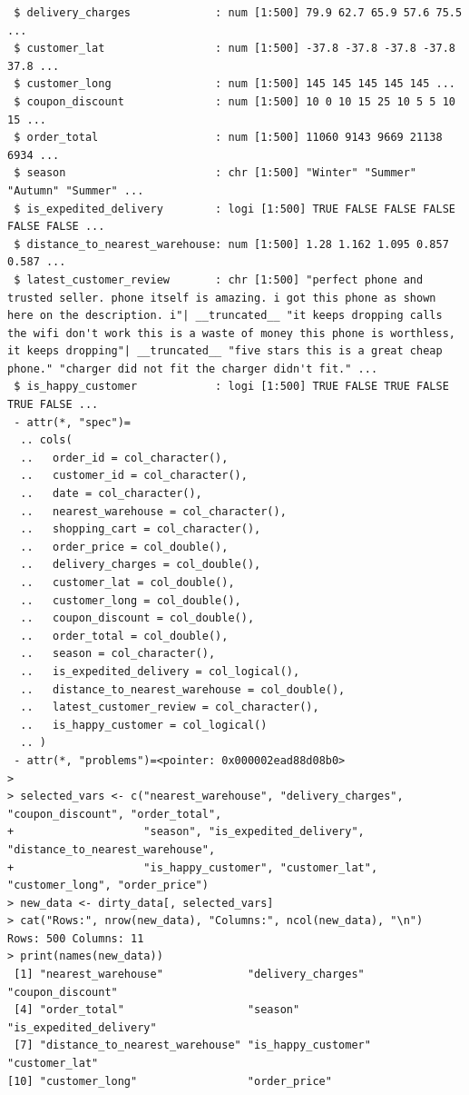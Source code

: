 \documentclass[12pt, a4paper]{article}
\begin{document}
\begin{lstlisting}
 $ delivery_charges             : num [1:500] 79.9 62.7 65.9 57.6 75.5 ...
 $ customer_lat                 : num [1:500] -37.8 -37.8 -37.8 -37.8 37.8 ...
 $ customer_long                : num [1:500] 145 145 145 145 145 ...
 $ coupon_discount              : num [1:500] 10 0 10 15 25 10 5 5 10 15 ...
 $ order_total                  : num [1:500] 11060 9143 9669 21138 6934 ...
 $ season                       : chr [1:500] "Winter" "Summer" "Autumn" "Summer" ...
 $ is_expedited_delivery        : logi [1:500] TRUE FALSE FALSE FALSE FALSE FALSE ...
 $ distance_to_nearest_warehouse: num [1:500] 1.28 1.162 1.095 0.857 0.587 ...
 $ latest_customer_review       : chr [1:500] "perfect phone and trusted seller. phone itself is amazing. i got this phone as shown here on the description. i"| __truncated__ "it keeps dropping calls the wifi don't work this is a waste of money this phone is worthless, it keeps dropping"| __truncated__ "five stars this is a great cheap phone." "charger did not fit the charger didn't fit." ...
 $ is_happy_customer            : logi [1:500] TRUE FALSE TRUE FALSE TRUE FALSE ...
 - attr(*, "spec")=
  .. cols(
  ..   order_id = col_character(),
  ..   customer_id = col_character(),
  ..   date = col_character(),
  ..   nearest_warehouse = col_character(),
  ..   shopping_cart = col_character(),
  ..   order_price = col_double(),
  ..   delivery_charges = col_double(),
  ..   customer_lat = col_double(),
  ..   customer_long = col_double(),
  ..   coupon_discount = col_double(),
  ..   order_total = col_double(),
  ..   season = col_character(),
  ..   is_expedited_delivery = col_logical(),
  ..   distance_to_nearest_warehouse = col_double(),
  ..   latest_customer_review = col_character(),
  ..   is_happy_customer = col_logical()
  .. )
 - attr(*, "problems")=<pointer: 0x000002ead88d08b0> 
> 
> selected_vars <- c("nearest_warehouse", "delivery_charges", "coupon_discount", "order_total",
+                    "season", "is_expedited_delivery", "distance_to_nearest_warehouse",
+                    "is_happy_customer", "customer_lat", "customer_long", "order_price")
> new_data <- dirty_data[, selected_vars]
> cat("Rows:", nrow(new_data), "Columns:", ncol(new_data), "\n")
Rows: 500 Columns: 11 
> print(names(new_data))
 [1] "nearest_warehouse"             "delivery_charges"              "coupon_discount"              
 [4] "order_total"                   "season"                        "is_expedited_delivery"        
 [7] "distance_to_nearest_warehouse" "is_happy_customer"             "customer_lat"                 
[10] "customer_long"                 "order_price"                  

\end{lstlisting}
\end{document}
